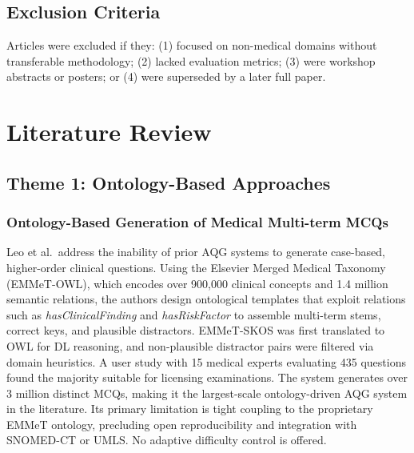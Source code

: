 \documentclass[conference]{IEEEtran}
\begin{document}
\subsection{Exclusion Criteria}
Articles were excluded if they: (1) focused on non-medical domains without transferable methodology; (2) lacked evaluation metrics; (3) were workshop abstracts or posters; or (4) were superseded by a later full paper.

\section{Literature Review}

\subsection{Theme 1: Ontology-Based Approaches}

\subsubsection{Ontology-Based Generation of Medical Multi-term MCQs~\cite{leo2019ontology}}
Leo et al.\ address the inability of prior AQG systems to generate case-based, higher-order clinical questions. Using the Elsevier Merged Medical Taxonomy (EMMeT-OWL), which encodes over 900,000 clinical concepts and 1.4 million semantic relations, the authors design ontological templates that exploit relations such as \textit{hasClinicalFinding} and \textit{hasRiskFactor} to assemble multi-term stems, correct keys, and plausible distractors. EMMeT-SKOS was first translated to OWL for DL reasoning, and non-plausible distractor pairs were filtered via domain heuristics. A user study with 15 medical experts evaluating 435 questions found the majority suitable for licensing examinations. The system generates over 3 million distinct MCQs, making it the largest-scale ontology-driven AQG system in the literature. Its primary limitation is tight coupling to the proprietary EMMeT ontology, precluding open reproducibility and integration with SNOMED-CT or UMLS. No adaptive difficulty control is offered.
\end{document}
